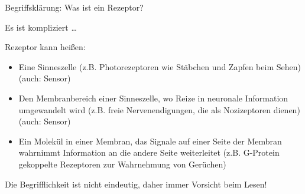 \documentclass{beamer}
\begin{document}



\begin{frame}{Begriffsklärung: Was ist ein Rezeptor?}

Es ist kompliziert \dots 

Rezeptor kann heißen: 

\begin{itemize}
    \item 
    Eine Sinneszelle (z.B. Photorezeptoren wie Stäbchen und Zapfen beim Sehen) (auch: Sensor)
    \item
    Den Membranbereich einer Sinneszelle, wo Reize in neuronale Information umgewandelt wird (z.B. freie Nervenendigungen, die als Nozizeptoren dienen) (auch: Sensor)
    \item
    Ein Molekül in einer Membran, das Signale auf einer Seite der Membran wahrnimmt Information an die andere Seite weiterleitet (z.B. G-Protein gekoppelte Rezeptoren zur Wahrnehmung von Gerüchen) 
\end{itemize}
    
Die Begrifflichkeit ist nicht eindeutig, daher immer Vorsicht beim Lesen!  

    

\end{frame}






\end{document}
